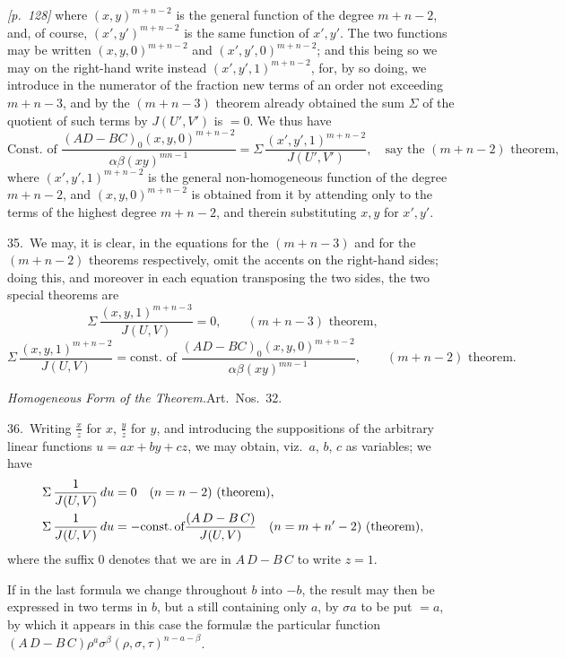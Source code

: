 \documentclass[11pt,a4paper]{article}
\theoremstyle{plain}
\theoremstyle{definition}
\theoremstyle{remark}
\begin{document}
\noindent\textit{[p.~128]} where $(x,y)^{m+n-2}$ is the general function of the degree
$m+n-2$, and, of course, $(x',y')^{m+n-2}$ is the same function of $x',y'$.
The two functions may be written $(x,y,0)^{m+n-2}$ and $(x',y',0)^{m+n-2}$;
and this being so we may on the right-hand write instead $(x',y',1)^{m+n-2}$,
for, by so doing, we introduce in the numerator of the fraction new terms of an
order not exceeding $m+n-3$, and by the $(m+n-3)$ theorem already obtained the
sum $\Sigma$ of the quotient of such terms by $J(U',V')$ is $=0$.
We thus have
\[
\text{Const. of }\frac{(AD-BC)_0(x,y,0)^{m+n-2}}{\alpha\beta(xy)^{mn-1}}
= \Sigma\,\frac{(x',y',1)^{m+n-2}}{J(U',V')},
\quad\text{say the }(m+n-2)\text{ theorem},
\]
where $(x',y',1)^{m+n-2}$ is the general non-homogeneous function of the
degree $m+n-2$, and $(x,y,0)^{m+n-2}$ is obtained from it by attending only
to the terms of the highest degree $m+n-2$, and therein substituting $x,y$
for $x',y'$.

35.\ We may, it is clear, in the equations for the $(m+n-3)$ and for the
$(m+n-2)$ theorems respectively, omit the accents on the right-hand sides;
doing this, and moreover in each equation transposing the two sides, the two
special theorems are
\[
\Sigma\,\frac{(x,y,1)^{m+n-3}}{J(U,V)} = 0,
\qquad (m+n-3)\text{ theorem},
\]
\[
\Sigma\,\frac{(x,y,1)^{m+n-2}}{J(U,V)}
= \text{const. of }\frac{(AD-BC)_0(x,y,0)^{m+n-2}}{\alpha\beta(xy)^{mn-1}},
\qquad (m+n-2)\text{ theorem}.
\]

\textit{Homogeneous Form of the Theorem.}\quad Art.\ Nos.~32.

36.\ Writing $\frac{x}{z}$ for $x$, $\frac{y}{z}$ for $y$, and introducing the suppositions of the arbitrary linear functions $u = ax + by + cz$, we may obtain, viz.\ $a$, $b$, $c$ as variables; we have
\begin{align*}
\Sigma\,\frac{1}{J(U, V)}\,du &= 0\quad (n = n - 2)\,\,\text{(theorem)},\\
\Sigma\,\frac{1}{J(U, V)}\,du &= -\text{const.\,of}\frac{(A\,D - B\,C)}{J(U, V)}\quad (n = m + n' - 2)\,\,\text{(theorem)},
\end{align*}
where the suffix 0 denotes that we are in $A\,D - B\,C$ to write $z = 1$.

If in the last formula we change throughout $b$ into $-b$, the result may then be expressed in two terms in $b$, but a still containing only $a$, by $\sigma a$ to be put $= a$, by which it appears in this case the formul\ae{} the particular function $(A\,D - B\,C)\rho^a \sigma^\beta (\rho, \sigma, \tau)^{n - a - \beta}$.
\end{document}
